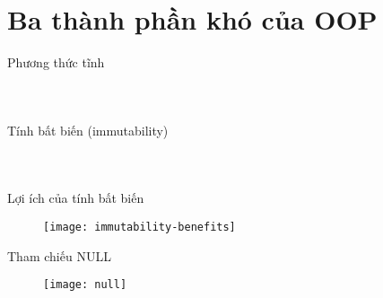 \documentclass{beamer}
\begin{document}
\section{Ba thành phần khó của OOP}

\begin{frame}{Phương thức tĩnh}
    \begin{columns}
        \column{\textwidth}
        \begin{figure}
            \centering
        \end{figure}
        \vspace{-0.5cm}
        \begin{figure}
            \centering
        \end{figure}
    \end{columns}
\end{frame}

\begin{frame}{Tính bất biến (immutability)}
    \begin{columns}
        \column{\textwidth}
        \begin{figure}
            \centering
        \end{figure}
        \vspace{-0.5cm}
        \begin{figure}
            \centering
        \end{figure}
    \end{columns}
\end{frame}

\begin{frame}{Lợi ích của tính bất biến}
    \begin{figure}
        \centering
        \texttt{[image: immutability-benefits]}
    \end{figure}
    \centering{}
\end{frame}

\begin{frame}{Tham chiếu NULL}
    \begin{figure}
        \centering
        \texttt{[image: null]}
    \end{figure}
    \centering{}
\end{frame}
\end{document}
